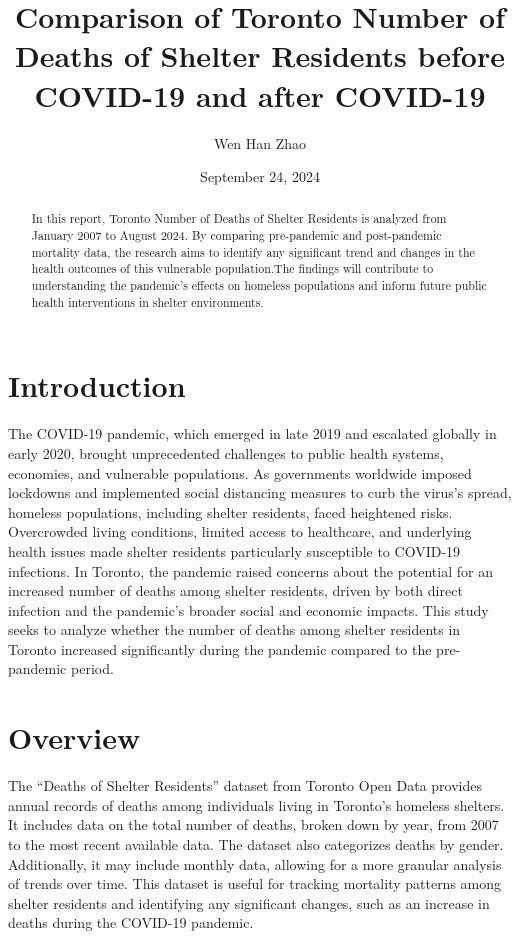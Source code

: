 \documentclass[
  letterpaper,
  DIV=11,
  numbers=noendperiod]{scrartcl}
\title{Comparison of Toronto Number of Deaths of Shelter Residents
before COVID-19 and after COVID-19}
\author{Wen Han Zhao}
\date{September 24, 2024}
\begin{document}
\maketitle
\begin{abstract}
In this report, Toronto Number of Deaths of Shelter Residents is
analyzed from January 2007 to August 2024. By comparing pre-pandemic and
post-pandemic mortality data, the research aims to identify any
significant trend and changes in the health outcomes of this vulnerable
population.The findings will contribute to understanding the pandemic's
effects on homeless populations and inform future public health
interventions in shelter environments.
\end{abstract}
\ifdefined\Shaded\renewenvironment{Shaded}{\begin{tcolorbox}[borderline west={3pt}{0pt}{shadecolor}, boxrule=0pt, interior hidden, frame hidden, sharp corners, breakable, enhanced]}{\end{tcolorbox}}\fi

\hypertarget{introduction}{%
\section{Introduction}\label{introduction}}

The COVID-19 pandemic, which emerged in late 2019 and escalated globally
in early 2020, brought unprecedented challenges to public health
systems, economies, and vulnerable populations. As governments worldwide
imposed lockdowns and implemented social distancing measures to curb the
virus's spread, homeless populations, including shelter residents, faced
heightened risks. Overcrowded living conditions, limited access to
healthcare, and underlying health issues made shelter residents
particularly susceptible to COVID-19 infections. In Toronto, the
pandemic raised concerns about the potential for an increased number of
deaths among shelter residents, driven by both direct infection and the
pandemic's broader social and economic impacts. This study seeks to
analyze whether the number of deaths among shelter residents in Toronto
increased significantly during the pandemic compared to the pre-pandemic
period.

\hypertarget{overview}{%
\section{Overview}\label{overview}}

The ``Deaths of Shelter Residents'' dataset from Toronto Open Data
provides annual records of deaths among individuals living in Toronto's
homeless shelters. It includes data on the total number of deaths,
broken down by year, from 2007 to the most recent available data. The
dataset also categorizes deaths by gender. Additionally, it may include
monthly data, allowing for a more granular analysis of trends over time.
This dataset is useful for tracking mortality patterns among shelter
residents and identifying any significant changes, such as an increase
in deaths during the COVID-19 pandemic.
\end{document}
